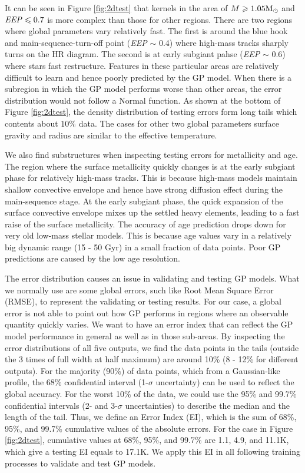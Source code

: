 It can be seen in Figure \ref{fig:2dtest} that kernels in the area of $M \geq 1.05 {\rm M_{\odot}}$ and ${\it EEP} \leq 0.7$ is more complex than those for other regions. 
%
There are two regions where global parameters vary relatively fast. The first is around the blue hook and main-sequence-turn-off point ({\it EEP} $\sim$ 0.4) where high-mass tracks sharply turns on the HR diagram. The second is at early subgiant pahse ({\it EEP} $\sim$ 0.6) where stars fast restructure. Features in these particular areas are relatively difficult to learn and hence poorly predicted by the GP model.  
%
When there is a subregion in which the GP model performs worse than other areas, the error distribution would not follow a Normal function. As shown at the bottom of Figure \ref{fig:2dtest}, the density distribution of testing errors form long tails which contents about $10\%$ data. The cases for other two global parameters surface gravity and radius are similar to the effective temperature.

We also find substructures when inspecting testing errors for metallicity and age. The region where the surface metallicity quickly changes is at the early subgiant phase for relatively high-mass tracks. This is because high-mass models maintain shallow convective envelope and hence have strong diffusion effect during the main-sequence stage. At the early subgiant phase, the quick expansion of the surface convective envelope mixes up the settled heavy elements, leading to a fast raise of the surface metallicity. 
%
The accuracy of age prediction drops down for very old low-mass stellar models. This is because age values vary in a relatively big dynamic range (15 - 50 Gyr) in a small fraction of data points. Poor GP predictions are caused by the low age resolution.         
 

The error distribution causes an issue in validating and testing GP models. What we normally use are some global errors, such like Root Mean Square Error (RMSE), to represent the validating or testing results. For our case, a global error is not able to point out how GP performs in regions where an observable quantity quickly varies. 
%
We want to have an error index that can reflect the GP model performance in general as well as in those sub-areas. By inspecting the error distributions of all five outputs, we find the data points in the tails (outside the 3 times of full width at half maximum) are around 10\% (8 - 12\% for different outputs).  For the majority (90\%) of data points, which from a Gaussian-like profile, the 68\% confidential interval (1-$\sigma$ uncertainty) can be used to reflect the global accuracy. For the worst 10\% of the data, we could use the 95\% and 99.7\% confidential intervals (2- and 3-$\sigma$ uncertainties) to describe the median and the length of the tail. Thus, we define an Error Index (EI), which is the sum of 68\%, 95\%, and 99.7\% cumulative values of the absolute errors. For the case in Figure \ref{fig:2dtest}, cumulative values at 68\%, 95\%, and 99.7\% are 1.1, 4.9, and 11.1K, which give a testing EI equals to 17.1K. We apply this EI in all following training processes to validate and test GP models. 

